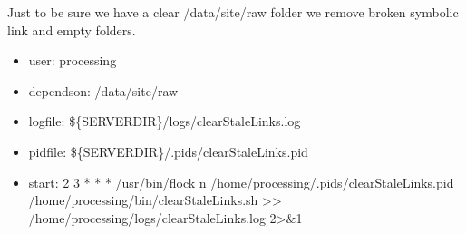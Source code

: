 \documentclass[letterpaper,10pt,english]{sphinxmanual}
\begin{document}
\sphinxAtStartPar
Just to be sure we have a clear /data/site/raw folder we remove broken symbolic link and empty folders.
\begin{itemize}
\item {} 
\sphinxAtStartPar
user: processing

\item {} 
\sphinxAtStartPar
depends\sphinxhyphen{}on:
\sphinxhyphen{} /data/site/raw

\item {} 
\sphinxAtStartPar
log\sphinxhyphen{}file:
\sphinxhyphen{} \$\{SERVERDIR\}/logs/clearStaleLinks.log

\item {} 
\sphinxAtStartPar
pid\sphinxhyphen{}file: \$\{SERVERDIR\}/.pids/clearStaleLinks.pid

\item {} 
\sphinxAtStartPar
start:
2 3 * * * /usr/bin/flock \sphinxhyphen{}n /home/processing/.pids/clearStaleLinks.pid /home/processing/bin/clearStaleLinks.sh \textgreater{}\textgreater{} /home/processing/logs/clearStaleLinks.log 2\textgreater{}\&1

\end{itemize}

\sphinxstepscope
\end{document}
